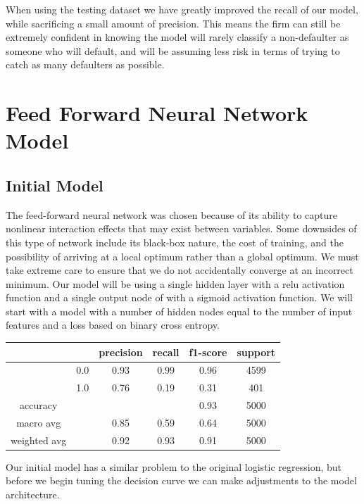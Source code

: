 \documentclass[12pt]{article}
\begin{document}
	
	When using the testing dataset we have greatly improved the recall of our model, while sacrificing a small amount of precision. This means the firm can still be extremely confident in knowing the model will rarely classify a non-defaulter as someone who will default, and will be assuming less risk in terms of trying to catch as many defaulters as possible. 
	
	
	\section{Feed Forward Neural Network Model}
	
	\subsection{Initial Model}
	
	The feed-forward neural network was chosen because of its ability to capture nonlinear interaction effects that may exist between variables. Some downsides of this type of network include its black-box nature, the cost of training, and the possibility of arriving at a local optimum rather than a global optimum. We must take extreme care to ensure that we do not accidentally converge at an incorrect minimum. Our model will be using a single hidden layer with a relu activation function and a single output node of with a sigmoid activation function. We will start with a model with a number of hidden nodes equal to the number of input features and a loss based on binary cross entropy. 
	
	\begin{tabular}{c|c|c|c|c|c}
	\hline
	& 		& 	precision &  recall  & f1-score   & support \\ \hline
	
	&  0.0	&		0.93 &     0.99   &  0.96   &  4599 \\ \hline
	&  1.0  &		0.76 &     0.19   &  0.31   &   401 \\ \hline
	
	accuracy    & & & &                       		  0.93   &   5000 \\ \hline
	macro avg   & &   			0.85   &   0.59  &    0.64   &   5000  \\ \hline
	weighted avg  & &   		0.92   &   0.93  &    0.91   &   5000 \\ \hline
	\end{tabular}
	
	Our initial model has a similar problem to the original logistic regression, but before we begin tuning the decision curve we can make adjustments to the model architecture. 
	
\end{document}
